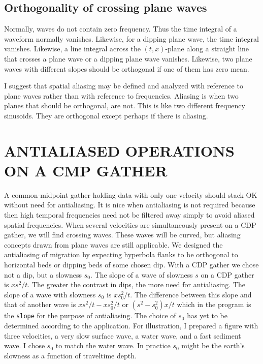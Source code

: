 \subsection{Orthogonality of crossing plane waves}
Normally, waves do not contain zero frequency.
Thus the time integral of a waveform normally vanishes.
Likewise,
for a dipping plane wave, the time integral vanishes.
Likewise,
a line integral
across the $(t,x)$-plane
along a straight line that crosses a plane wave
or a dipping plane wave vanishes.
Likewise,
two plane waves with different slopes should be orthogonal
if one of them has zero mean.

\par
I suggest that spatial aliasing may be defined and analyzed
with reference to plane waves
rather than with reference to frequencies.
Aliasing is when two planes that should be orthogonal, are not.
This is like two different frequency sinusoids.
They are orthogonal except perhaps if there is aliasing.

\section{ANTIALIASED OPERATIONS ON A CMP GATHER}
A common-midpoint gather holding data with only one velocity
should stack OK without need for antialiasing.
It is nice when antialiasing is not required
because then high temporal frequencies need not be filtered away
simply to avoid aliased spatial frequencies.
When several velocities are simultaneously present
on a CDP gather, we will find crossing waves.
These waves will be curved,
but aliasing concepts drawn from plane waves are still applicable.
We designed the antialiasing of migration by expecting hyperbola
flanks to be orthogonal to horizontal beds or dipping beds
of some chosen dip.
With a CDP gather we chose not a dip, but a slowness $s_0$.
The slope of a wave of slowness $s$ on a CDP gather is $xs^2/t$.
The greater the contrast in dips, the more need for antialiasing.
The slope of a wave with slowness $s_0$ is $xs_0^2/t$.
The difference between this slope and that of another wave is
$xs^2/t - xs_0^2/t$
or
$(s^2-s_0^2)x/t$
which in the program is the {\tt slope} for
the purpose of antialiasing.
The choice of $s_0$ has yet to be determined according to the application.
For illustration, I prepared a figure with three velocities,
a very slow surface wave, a water wave, and a fast sediment wave.
I chose $s_0$ to match the water wave.
In practice $s_0$ might be the earth's slowness
as a function of traveltime depth.

